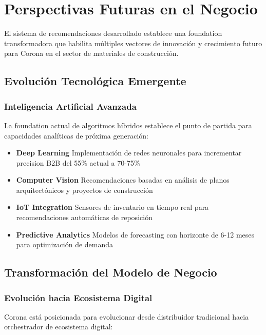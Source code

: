 \documentclass[twocolumn]{article}
\begin{document}
\section{Perspectivas Futuras en el Negocio}

El sistema de recomendaciones desarrollado establece una foundation transformadora que habilita múltiples vectores de innovación y crecimiento futuro para Corona en el sector de materiales de construcción.

\subsection{Evolución Tecnológica Emergente}

\subsubsection{Inteligencia Artificial Avanzada}

La foundation actual de algoritmos híbridos establece el punto de partida para capacidades analíticas de próxima generación:

\begin{itemize}
    \item \textbf{Deep Learning} Implementación de redes neuronales para incrementar precision B2B del 55\% actual a 70-75\%
    \item \textbf{Computer Vision} Recomendaciones basadas en análisis de planos arquitectónicos y proyectos de construcción
    \item \textbf{IoT Integration} Sensores de inventario en tiempo real para recomendaciones automáticas de reposición
    \item \textbf{Predictive Analytics} Modelos de forecasting con horizonte de 6-12 meses para optimización de demanda
\end{itemize}

\subsection{Transformación del Modelo de Negocio}

\subsubsection{Evolución hacia Ecosistema Digital}

Corona está posicionada para evolucionar desde distribuidor tradicional hacia orchestrador de ecosistema digital:
\end{document}
